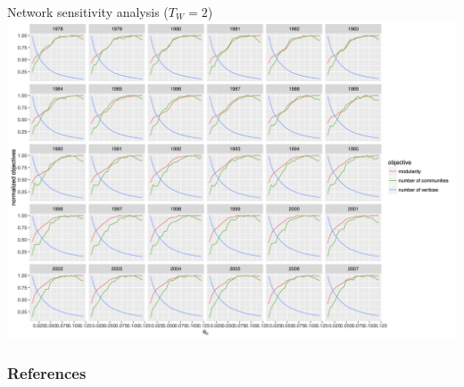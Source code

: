 \documentclass{beamer}
\begin{document}
\begin{frame}{Network sensitivity analysis ($T_W = 2$)}
	\includegraphics[width=\textwidth]{figures/normalizedObjs-dispth_window3_eth4_1e-5.png}
\end{frame}










\begin{frame}[allowframebreaks]
\frametitle{References}


\end{frame}
\end{document}
